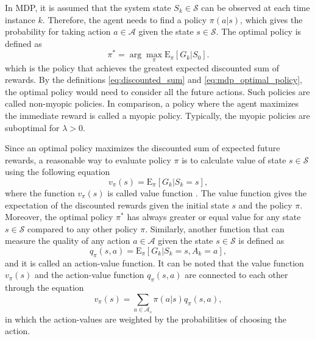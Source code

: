 \documentclass[english, 12pt, a4paper, elec, utf8, a-1b, online]{aaltothesis}
\newcommand{\Epolicy}[1]{\mathrm{E}_\pi \left[ #1 \right]}
\newcommand{\Ss}{\mathcal{S}}
\newcommand{\As}{\mathcal{A}}
\begin{document}
In MDP, it is assumed that the system state $S_k \in \Ss$ can be observed at each time instance $k$.
Therefore, the agent needs to find a policy $\pi(a | s)$, which gives the probability for taking action $a \in \As$ given the state $s \in \Ss$.
The optimal policy is defined as
\begin{equation}\label{eq:mdp_optimal_policy}
    \pi^* = \arg\max_\pi\Epolicy{G_k | S_0}.
\end{equation}
which is the policy that achieves the greatest expected discounted sum of rewards.
By the definitions \eqref{eq:discounted_sum} and \eqref{eq:mdp_optimal_policy}, the optimal policy would need to consider all the future actions.
Such policies are called non-myopic policies.
In comparison, a policy where the agent maximizes the immediate reward is called a myopic policy. 
Typically, the myopic policies are suboptimal for $\lambda>0$.

Since an optimal policy maximizes the discounted sum of expected future rewards, a reasonable way to evaluate policy $\pi$ is to calculate value of state $s \in \Ss$ using the following equation
\begin{equation} \label{eq:value}
    v_\pi(s) = \Epolicy{G_k | S_k=s},
\end{equation}
where the function $v_\pi(s)$ is called value function \cite{Sutton2018}.
The value function gives the expectation of the discounted rewards given the initial state $s$ and the policy $\pi$.
Moreover, the optimal policy $\pi^*$ has always greater or equal value for any state $s \in \Ss$ compared to any other policy $\pi$.
Similarly, another function that can measure the quality of any action $a \in \As$ given the state $s \in \Ss$ is defined as
\begin{equation}\label{eq:action_value}
    q_\pi(s, a) = \Epolicy{G_k | S_k=s, A_k=a},
\end{equation}
and it is called an action-value function.
It can be noted that the value function $v_\pi(s)$ and the action-value function $ q_\pi(s, a)$ are connected to each other through the equation  
\begin{equation}\label{eq:value_action_value}
 v_\pi(s) =  \sum_{a\in \As_s} \pi(a | s) q_\pi(s, a),
\end{equation}
in which the action-values are weighted by the probabilities of choosing the action.
\end{document}
